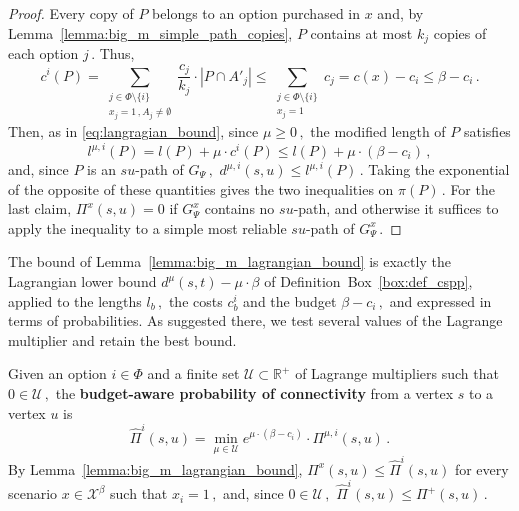 \documentclass[11pt,a4paper]{report}
\theoremstyle{definition}
\theoremstyle{remark}
\begin{document}
\begin{proof}
  Every copy of $P$ belongs to an option purchased in $x$ and, by Lemma~\ref{lemma:big_m_simple_path_copies}, $P$ contains at most $k_j$ copies of each option $j\,.$ Thus,
  \begin{equation}
    c^i(P) = \sum_{\substack{j \in \Phi \setminus \{i\} \\ x_j = 1\,, A_j \neq \emptyset}} \frac{c_j}{k_j} \cdot |P \cap A'_j| \leq \sum_{\substack{j \in \Phi \setminus \{i\} \\ x_j = 1}} c_j = c(x) - c_i \leq \beta - c_i\,.
  \end{equation}
  Then, as in \eqref{eq:langragian_bound}, since $\mu \geq 0\,,$ the modified length of $P$ satisfies
  \begin{equation}
    l^{\mu,i}(P) = l(P) + \mu \cdot c^i(P) \leq l(P) + \mu \cdot (\beta - c_i)\,,
  \end{equation}
  and, since $P$ is an $su$-path of $G_\Psi\,,$ $d^{\mu,i}(s,u) \leq l^{\mu,i}(P)\,.$ Taking the exponential of the opposite of these quantities gives the two inequalities on $\pi(P)\,.$ For the last claim, $\Pi^x(s,u) = 0$ if $G^x_\Psi$ contains no $su$-path, and otherwise it suffices to apply the inequality to a simple most reliable $su$-path of $G^x_\Psi\,.$
\end{proof}

The bound of Lemma~\ref{lemma:big_m_lagrangian_bound} is exactly the Lagrangian lower bound $d^{\mu}(s,t) - \mu \cdot \beta$ of Definition~Box~\ref{box:def_cspp}, applied to the lengths $l_b\,,$ the costs $c^i_b$ and the budget $\beta - c_i\,,$ and expressed in terms of probabilities. As suggested there, we test several values of the Lagrange multiplier and retain the best bound.

\begin{timportantbox}
  Given an option $i \in \Phi$ and a finite set $\mathcal{U} \subset \mathbb{R}^+$ of Lagrange multipliers such that $0 \in \mathcal{U}\,,$ the \textbf{budget-aware probability of connectivity} from a vertex $s$ to a vertex $u$ is
  \begin{equation}\label{eq:big_m_budget_aware_probability}
    \widehat{\Pi}^i(s,u) = \min_{\mu \in \mathcal{U}} e^{\mu \cdot (\beta - c_i)} \cdot \Pi^{\mu,i}(s,u)\,.
  \end{equation}
  By Lemma~\ref{lemma:big_m_lagrangian_bound}, $\Pi^x(s,u) \leq \widehat{\Pi}^i(s,u)$ for every scenario $x \in \mathcal{X}^\beta$ such that $x_i = 1\,,$ and, since $0 \in \mathcal{U}\,,$ $\widehat{\Pi}^i(s,u) \leq \Pi^+(s,u)\,.$
\end{timportantbox}
\end{document}
